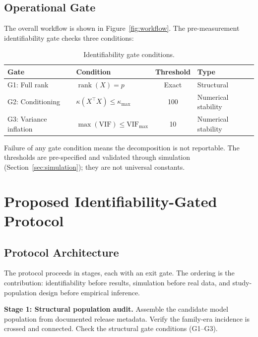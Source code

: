 \documentclass[journal]{IEEEtran}
\begin{document}
\subsection{Operational Gate}

The overall workflow is shown in Figure~\ref{fig:workflow}. The pre-measurement identifiability gate checks three conditions:

\begin{table}[!t]
\centering
\caption{Identifiability gate conditions.}
\label{tab:gate}
\begin{tabular}{llcl}
\toprule
Gate & Condition & Threshold & Type \\
\midrule
G1: Full rank & $\operatorname{rank}(X) = p$ & Exact & Structural \\
G2: Conditioning & $\kappa(X^\top X) \leq \kappa_{\max}$ & 100 & Numerical stability \\
G3: Variance inflation & $\max(\text{VIF}) \leq \text{VIF}_{\max}$ & 10 & Numerical stability \\
\bottomrule
\end{tabular}
\end{table}

Failure of any gate condition means the decomposition is not reportable. The thresholds are pre-specified and validated through simulation (Section~\ref{sec:simulation}); they are not universal constants.

\section{Proposed Identifiability-Gated Protocol}
\label{sec:protocol}

\subsection{Protocol Architecture}

The protocol proceeds in stages, each with an exit gate. The ordering is the contribution: identifiability before results, simulation before real data, and study-population design before empirical inference.

\textbf{Stage 1: Structural population audit.} Assemble the candidate model population from documented release metadata. Verify the family-era incidence is crossed and connected. Check the structural gate conditions (G1--G3).
\end{document}
